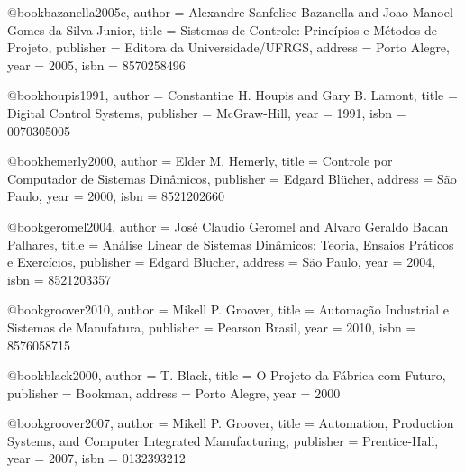 @book{bazanella2005c,
  author = {Alexandre Sanfelice Bazanella and Joao Manoel Gomes da Silva Junior},
  title = {Sistemas de Controle: Princípios e Métodos de Projeto},
  publisher = {Editora da Universidade/UFRGS},
  address = {Porto Alegre},
  year = {2005},
  isbn = {8570258496}
}

@book{houpis1991,
  author = {Constantine H. Houpis and Gary B. Lamont},
  title = {Digital Control Systems},
  publisher = {McGraw-Hill},
  year = {1991},
  isbn = {0070305005}
}

@book{hemerly2000,
  author = {Elder M. Hemerly},
  title = {Controle por Computador de Sistemas Dinâmicos},
  publisher = {Edgard Blücher},
  address = {São Paulo},
  year = {2000},
  isbn = {8521202660}
}

@book{geromel2004,
  author = {José Claudio Geromel and Alvaro Geraldo Badan Palhares},
  title = {Análise Linear de Sistemas Dinâmicos: Teoria, Ensaios Práticos e Exercícios},
  publisher = {Edgard Blücher},
  address = {São Paulo},
  year = {2004},
  isbn = {8521203357}
}

%

@book{groover2010,
  author = {Mikell P. Groover},
  title = {Automação Industrial e Sistemas de Manufatura},
  publisher = {Pearson Brasil},
  year = {2010},
  isbn = {8576058715}
}

@book{black2000,
  author = {T. Black},
  title = {O Projeto da Fábrica com Futuro},
  publisher = {Bookman},
  address = {Porto Alegre},
  year = {2000}
}

@book{groover2007,
  author = {Mikell P. Groover},
  title = {Automation, Production Systems, and Computer Integrated Manufacturing},
  publisher = {Prentice-Hall},
  year = {2007},
  isbn = {0132393212}
}

